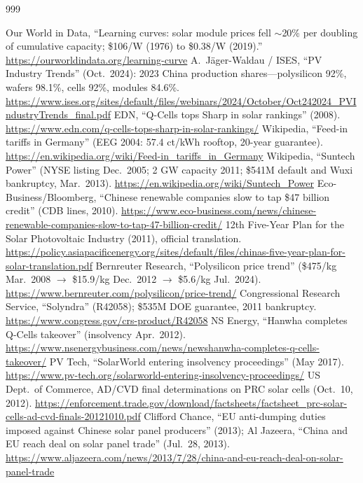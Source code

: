 \begin{thebibliography}{999}
\setlength{\itemsep}{0pt}
\small
\raggedright

 Our World in Data, ``Learning curves: solar module prices fell $\sim$20\% per doubling of cumulative capacity; \$106/W (1976) to \$0.38/W (2019).'' \url{https://ourworldindata.org/learning-curve}
 A.~J\"ager-Waldau / ISES, ``PV Industry Trends'' (Oct.\ 2024): 2023 China production shares---polysilicon 92\%, wafers 98.1\%, cells 92\%, modules 84.6\%. \url{https://www.ises.org/sites/default/files/webinars/2024/October/Oct242024_PVIndustryTrends_final.pdf}
 EDN, ``Q-Cells tops Sharp in solar rankings'' (2008). \url{https://www.edn.com/q-cells-tops-sharp-in-solar-rankings/}
 Wikipedia, ``Feed-in tariffs in Germany'' (EEG 2004: 57.4 ct/kWh rooftop, 20-year guarantee). \url{https://en.wikipedia.org/wiki/Feed-in_tariffs_in_Germany}
 Wikipedia, ``Suntech Power'' (NYSE listing Dec.\ 2005; 2 GW capacity 2011; \$541M default and Wuxi bankruptcy, Mar.\ 2013). \url{https://en.wikipedia.org/wiki/Suntech_Power}
 Eco-Business/Bloomberg, ``Chinese renewable companies slow to tap \$47 billion credit'' (CDB lines, 2010). \url{https://www.eco-business.com/news/chinese-renewable-companies-slow-to-tap-47-billion-credit/}
 12th Five-Year Plan for the Solar Photovoltaic Industry (2011), official translation. \url{https://policy.asiapacificenergy.org/sites/default/files/chinas-five-year-plan-for-solar-translation.pdf}
 Bernreuter Research, ``Polysilicon price trend'' (\$475/kg Mar.\ 2008 $\rightarrow$ \$15.9/kg Dec.\ 2012 $\rightarrow$ \$5.6/kg Jul.\ 2024). \url{https://www.bernreuter.com/polysilicon/price-trend/}
 Congressional Research Service, ``Solyndra'' (R42058); \$535M DOE guarantee, 2011 bankruptcy. \url{https://www.congress.gov/crs-product/R42058}
 NS Energy, ``Hanwha completes Q-Cells takeover'' (insolvency Apr.\ 2012). \url{https://www.nsenergybusiness.com/news/newshanwha-completes-q-cells-takeover/}
 PV Tech, ``SolarWorld entering insolvency proceedings'' (May 2017). \url{https://www.pv-tech.org/solarworld-entering-insolvency-proceedings/}
 US Dept.\ of Commerce, AD/CVD final determinations on PRC solar cells (Oct.\ 10, 2012). \url{https://enforcement.trade.gov/download/factsheets/factsheet_prc-solar-cells-ad-cvd-finals-20121010.pdf}
 Clifford Chance, ``EU anti-dumping duties imposed against Chinese solar panel producers'' (2013); Al Jazeera, ``China and EU reach deal on solar panel trade'' (Jul.\ 28, 2013). \url{https://www.aljazeera.com/news/2013/7/28/china-and-eu-reach-deal-on-solar-panel-trade}

\end{thebibliography}
